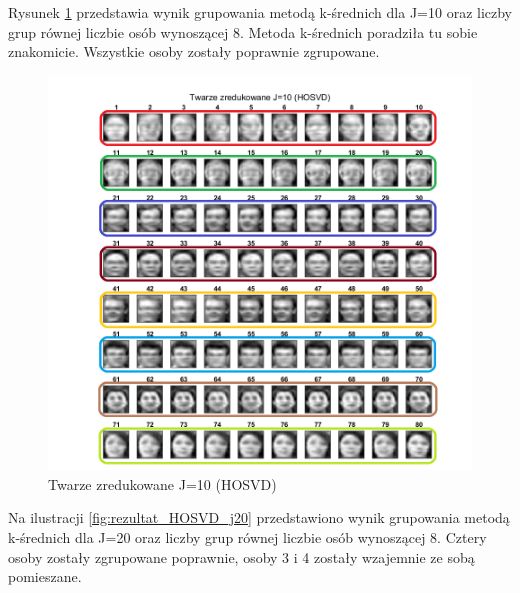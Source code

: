 \documentclass[11pt, a4paper]{article}
\newcommand{\fbi}{\leavevmode{\parindent=1em\indent}}
\begin{document}
\newpage
\fbi
Rysunek \ref{fig:rezultat_HOSVD_j10} przedstawia wynik grupowania metodą k-średnich dla J=10 oraz liczby grup równej liczbie osób wynoszącej 8. Metoda k-średnich poradziła tu sobie znakomicie. Wszystkie osoby zostały poprawnie zgrupowane.

\begin{figure}[H]
	\centering
	\includegraphics[width=1\textwidth]{./assets/rezultat_HOSVD_j10.png}
	\caption{Twarze zredukowane J=10 (HOSVD)}
	\label{fig:rezultat_HOSVD_j10}
\end{figure}

\newpage
\fbi
Na ilustracji \ref{fig:rezultat_HOSVD_j20} przedstawiono wynik grupowania metodą k-średnich dla J=20 oraz liczby grup równej liczbie osób wynoszącej 8. Cztery osoby zostały zgrupowane poprawnie, osoby 3 i 4 zostały wzajemnie ze sobą pomieszane.
\end{document}
